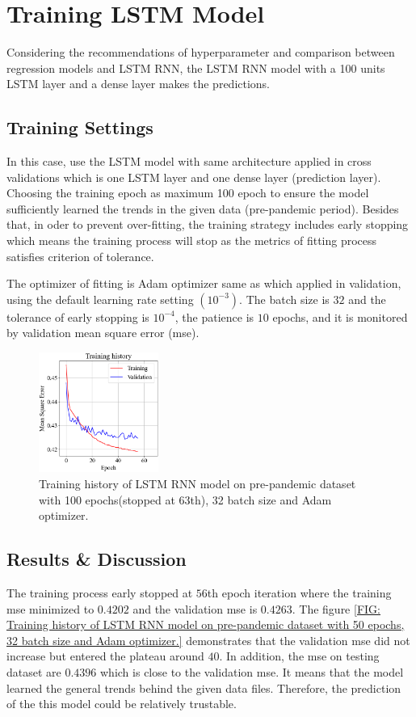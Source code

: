 \section{Training LSTM Model}
Considering the recommendations of hyperparameter and 
comparison between regression models and LSTM RNN, the LSTM RNN model 
with a 100 units LSTM layer and a dense layer makes the predictions.
\subsection{Training Settings}
In this case, use the LSTM model with same architecture applied in 
cross validations which is one LSTM layer and one dense layer (prediction layer).
Choosing the training epoch as maximum 100 epoch to ensure the model
sufficiently learned the trends in the given data (pre-pandemic period).
Besides that, in oder to prevent over-fitting, the training strategy includes 
early stopping which means the training process will stop as the metrics of 
fitting process satisfies criterion of tolerance. 

The optimizer of fitting is Adam optimizer same as which applied in validation, 
using the default learning rate setting $(10^{-3})$. 
The batch size is $32$ and 
the tolerance of early stopping is $10^{-4}$,
the patience is $10$ epochs, and it is monitored by validation mean square error 
(mse). 
\begin{figure}[H]
    \centering
    \includegraphics[width=0.35\textwidth]{chap/fig3.png}
    \caption{
        \footnotesize
        Training history of LSTM RNN model on pre-pandemic dataset with 
        100 epochs(stopped at 63th), 32 batch size and Adam optimizer.}
    \label{FIG: Training history of LSTM RNN model on pre-pandemic dataset with 
    50 epochs, 32 batch size and Adam optimizer.}
\end{figure}
\subsection{Results \& Discussion}
The training process early stopped at $56$th epoch iteration where the training 
mse minimized to $0.4202$ and the validation mse is $0.4263$. 
The figure 
\ref{FIG: Training history of LSTM RNN model on 
pre-pandemic dataset with 50 epochs, 32 batch size and Adam optimizer.}
demonstrates that the validation mse did not increase but 
entered the plateau around $40$.
In addition, the mse on testing dataset are $0.4396$ which is close to the validation 
mse. It means that the model learned the general trends behind the given data files.
Therefore, the prediction of the this model could be relatively trustable.